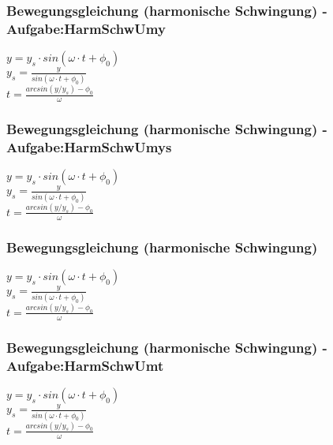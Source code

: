 \subsubsection{Bewegungsgleichung (harmonische Schwingung) - Aufgabe:HarmSchwUmy} 
\begin{minipage}{0.45\textwidth} 
$ y = y_{s} \cdot sin(\omega \cdot t+\phi _{0} ) $\\ 
$ y_{s} = \frac{    y}{sin(\omega \cdot t+\phi _{0} )} $\\ 
$ t = \frac{arcsin(y/y_{s} )-\phi _{0} }{    \omega } $\\ 
\end{minipage} 
\begin{minipage}{0.45\textwidth} 
 
\end{minipage} 
\subsubsection{Bewegungsgleichung (harmonische Schwingung) - Aufgabe:HarmSchwUmys} 
\begin{minipage}{0.45\textwidth} 
$ y = y_{s} \cdot sin(\omega \cdot t+\phi _{0} ) $\\ 
$ y_{s} = \frac{    y}{sin(\omega \cdot t+\phi _{0} )} $\\ 
$ t = \frac{arcsin(y/y_{s} )-\phi _{0} }{    \omega } $\\ 
\end{minipage} 
\begin{minipage}{0.45\textwidth} 
 
\end{minipage} 
\subsubsection{Bewegungsgleichung (harmonische Schwingung)} 
\begin{minipage}{0.45\textwidth} 
$ y = y_{s} \cdot sin(\omega \cdot t+\phi _{0} ) $\\ 
$ y_{s} = \frac{    y}{sin(\omega \cdot t+\phi _{0} )} $\\ 
$ t = \frac{arcsin(y/y_{s} )-\phi _{0} }{    \omega } $\\ 
\end{minipage} 
\begin{minipage}{0.45\textwidth} 
 
\end{minipage} 
\subsubsection{Bewegungsgleichung (harmonische Schwingung) - Aufgabe:HarmSchwUmt} 
\begin{minipage}{0.45\textwidth} 
$ y = y_{s} \cdot sin(\omega \cdot t+\phi _{0} ) $\\ 
$ y_{s} = \frac{    y}{sin(\omega \cdot t+\phi _{0} )} $\\ 
$ t = \frac{arcsin(y/y_{s} )-\phi _{0} }{    \omega } $\\ 
\end{minipage} 
\begin{minipage}{0.45\textwidth} 
 
\end{minipage} 

